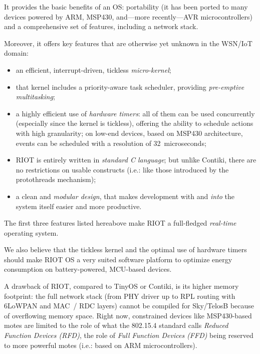 \documentclass[a4paper,twoside]{article}
\begin{document}
It provides the basic benefits of an OS: portability (it has been ported
to many devices powered by ARM, MSP430, and---more recently---AVR
microcontrollers) and a comprehensive set of features, including
a network stack.

Moreover, it offers key features that are otherwise yet unknown in
the WSN/IoT domain:

\begin{itemize}

\item an efficient, interrupt-driven, tickless \emph{micro-kernel};

\item that kernel includes a priority-aware task scheduler, providing
      \emph{pre-emptive multitasking};

\item a highly efficient use of \emph{hardware timers}: all of them can be
      used concurrently (especially since the kernel is tickless), offering
      the ability to schedule actions with high granularity; on low-end
      devices, based on MSP430 architecture, events can be scheduled
      with a resolution of 32~microseconds;

\item RIOT is entirely written in \emph{standard C language}; but unlike
      Contiki, there are no restrictions on usable constructs (i.e.: like
      those introduced by the protothreads mechanism);

\item a clean and \emph{modular design}, that makes development with and
      \emph{into} the system itself easier and more productive.

\end{itemize}

The first three features listed hereabove make RIOT a full-fledged
\emph{real-time} operating system.

We also believe that the tickless kernel and the optimal use of hardware
timers should make RIOT OS a very suited software platform to optimize energy
consumption on battery-powered, MCU-based devices.

A drawback of RIOT, compared to TinyOS or Contiki, is its higher memory
footprint: the full network stack (from PHY driver up to RPL routing with
\mbox{6LoWPAN} and MAC~/ RDC layers) cannot be compiled for Sky/TelosB
because of overflowing memory space. Right now, constrained devices like
MSP430-based motes are limited to the role of what the 802.15.4 standard
calls \emph{Reduced Function Devices (RFD)}, the role of \emph{Full
Function Devices (FFD)} being reserved to more powerful motes (i.e.:
based on ARM microcontrollers).
\end{document}
